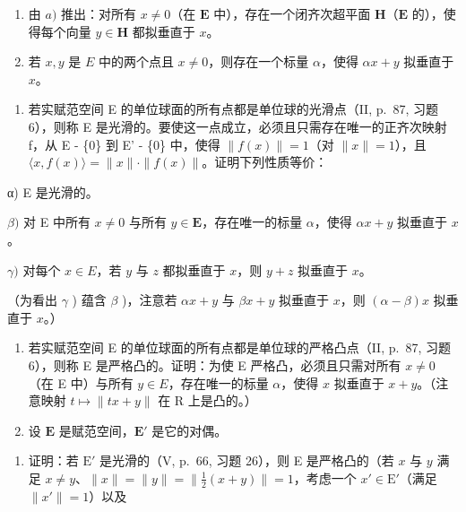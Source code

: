 \begin{enumerate}
\def\labelenumi{\alph{enumi})}
\setcounter{enumi}{1}
\item
  由 \(a)\) 推出：对所有 \(x \neq 0\)（在 \(\mathbf{E}\) 中），存在一个闭齐次超平面 \(\mathbf{H}\)（\(\mathbf{E}\) 的），使得每个向量 \(y \in \mathbf{H}\) 都拟垂直于 \(x\)。
\item
  若 \(x, y\) 是 \(E\) 中的两个点且 \(x \neq 0\)，则存在一个标量 \(\alpha\)，使得 \(\alpha x + y\) 拟垂直于 \(x\)。
\end{enumerate}

\begin{enumerate}
\def\labelenumi{\arabic{enumi})}
\setcounter{enumi}{25}
\tightlist
\item
  若实赋范空间 E 的单位球面的所有点都是单位球的光滑点（II, p.~87, 习题 6），则称 E 是光滑的。要使这一点成立，必须且只需存在唯一的正齐次映射 f，从 E - \{0\} 到 E' - \{0\} 中，使得 \(\|f(x)\| = 1\)（对 \(\|x\| = 1\)），且 \(\langle x, f(x) \rangle = \|x\| \cdot \|f(x)\|\)。证明下列性质等价：
\end{enumerate}

α) E 是光滑的。

\(\beta)\) 对 E 中所有 \(x \neq 0\) 与所有 \(y \in \mathbf{E}\)，存在唯一的标量 \(\alpha\)，使得 \(\alpha x + y\) 拟垂直于 \(x\)。

\(\gamma)\) 对每个 \(x \in E\)，若 \(y\) 与 \(z\) 都拟垂直于 \(x\)，则 \(y + z\) 拟垂直于 \(x\)。

（为看出 \(\gamma\) ) 蕴含 \(\beta\) )，注意若 \(\alpha x + y\) 与 \(\beta x + y\) 拟垂直于 \(x\)，则 \((\alpha - \beta)x\) 拟垂直于 \(x\)。）

\begin{enumerate}
\def\labelenumi{\arabic{enumi})}
\setcounter{enumi}{26}
\item
  若实赋范空间 E 的单位球面的所有点都是单位球的严格凸点（II, p.~87, 习题 6），则称 E 是严格凸的。证明：为使 E 严格凸，必须且只需对所有 \(x \neq 0\)（在 E 中）与所有 \(y \in E\)，存在唯一的标量 \(\alpha\)，使得 \(x\) 拟垂直于 \(x + y\)。（注意映射 \(t \mapsto \| tx + y \|\) 在 R 上是凸的。）
\item
  设 \(\mathbf{E}\) 是赋范空间，\(\mathbf{E}'\) 是它的对偶。
\end{enumerate}

\begin{enumerate}
\def\labelenumi{\alph{enumi})}
\tightlist
\item
  证明：若 \(\mathrm{E}'\) 是光滑的（V, p.~66, 习题 26），则 E 是严格凸的（若 \(x\) 与 \(y\) 满足 \(x \neq y\)、\(\| x \| = \| y \| = \| \frac{1}{2}(x + y) \| = 1\)，考虑一个 \(x' \in \mathrm{E}'\)（满足 \(\| x' \| = 1\)）以及
\end{enumerate}

